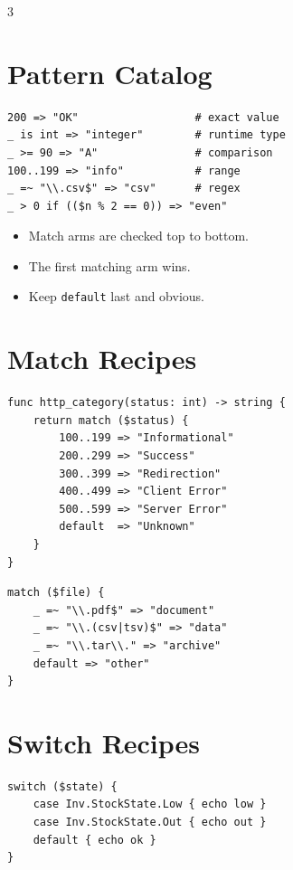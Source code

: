 \begin{multicols*}{3}

\section{Pattern Catalog}
\begin{lstlisting}
200 => "OK"                  # exact value
_ is int => "integer"        # runtime type
_ >= 90 => "A"               # comparison
100..199 => "info"           # range
_ =~ "\\.csv$" => "csv"      # regex
_ > 0 if (($n % 2 == 0)) => "even"
\end{lstlisting}

\begin{itemize}
\item Match arms are checked top to bottom.
\item The first matching arm wins.
\item Keep \texttt{default} last and obvious.
\end{itemize}

\section{Match Recipes}
\begin{lstlisting}
func http_category(status: int) -> string {
    return match ($status) {
        100..199 => "Informational"
        200..299 => "Success"
        300..399 => "Redirection"
        400..499 => "Client Error"
        500..599 => "Server Error"
        default  => "Unknown"
    }
}
\end{lstlisting}

\begin{lstlisting}
match ($file) {
    _ =~ "\\.pdf$" => "document"
    _ =~ "\\.(csv|tsv)$" => "data"
    _ =~ "\\.tar\\." => "archive"
    default => "other"
}
\end{lstlisting}

\section{Switch Recipes}
\begin{lstlisting}
switch ($state) {
    case Inv.StockState.Low { echo low }
    case Inv.StockState.Out { echo out }
    default { echo ok }
}
\end{lstlisting}


\end{multicols*}
